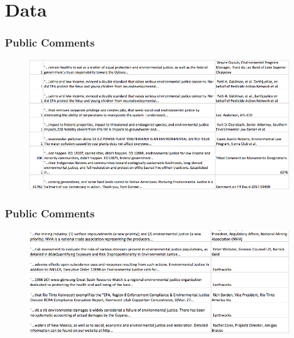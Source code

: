 \documentclass[10pt]{beamer}
\begin{document}
\section{Data}

\begin{frame}
\frametitle{Public Comments}
\begin{figure}
\includegraphics[width = \textwidth]{ejsample2}
\end{figure}
\end{frame}

\begin{frame}
\frametitle{Public Comments}
\begin{figure}
\includegraphics[width = \textwidth]{ejsample}
\end{figure}
\end{frame}
\end{document}
